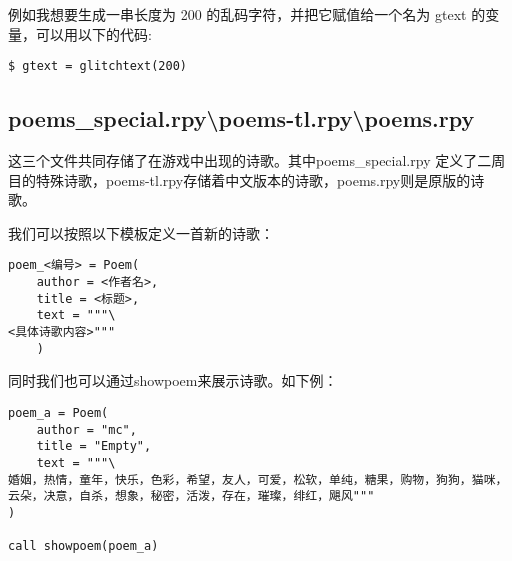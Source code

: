例如我想要生成一串长度为 200 的乱码字符，并把它赋值给一个名为 gtext 的变量，可以用以下的代码:
\begin{lstlisting}
$ gtext = glitchtext(200)
\end{lstlisting}

\subsection{poems\_special.rpy\textbackslash poems-tl.rpy\textbackslash poems.rpy}

这三个文件共同存储了在游戏中出现的诗歌。其中poems\_special.rpy 定义了二周目的特殊诗歌，poems-tl.rpy存储着中文版本的诗歌，poems.rpy则是原版的诗歌。

我们可以按照以下模板定义一首新的诗歌：
\begin{lstlisting}
poem_<编号> = Poem(
    author = <作者名>,
    title = <标题>,
    text = """\
<具体诗歌内容>"""
    )
\end{lstlisting}

同时我们也可以通过showpoem来展示诗歌。如下例：
\begin{lstlisting}
poem_a = Poem(
    author = "mc",
    title = "Empty",
    text = """\
婚姻，热情，童年，快乐，色彩，希望，友人，可爱，松软，单纯，糖果，购物，狗狗，猫咪，云朵，决意，自杀，想象，秘密，活泼，存在，璀璨，绯红，飓风"""
)

call showpoem(poem_a)
\end{lstlisting}